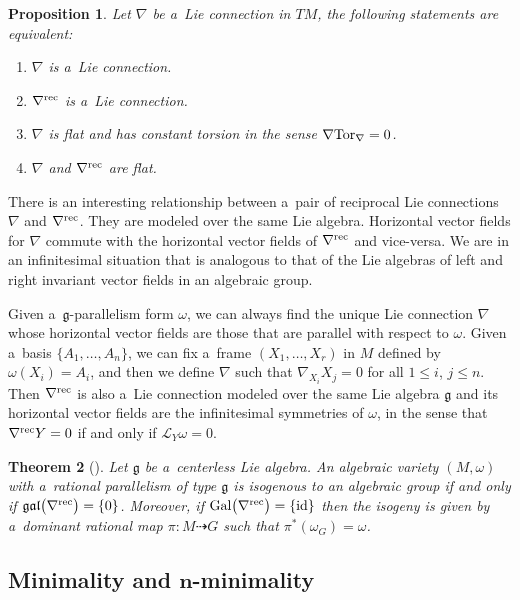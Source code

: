 \documentclass[10pt,a4paper]{amsart}
\numberwithin{equation}{section}
\newtheorem{Theorem}{Theorem}[section]
\newtheorem{Proposition}[Theorem]{Proposition}
\theoremstyle{definition}
\begin{document}
\begin{Proposition}
Let $\nabla$ be a~Lie connection in $TM$, the following statements are equivalent:
\begin{enumerate}\itemsep=0pt
 \item[$(1)$] $\nabla$ is a~Lie connection.
 \item[$(2)$] $\nabla^{\rm rec}$ is a~Lie connection.
 \item[$(3)$] $\nabla$ is flat and has constant torsion in the sense $\nabla {\rm Tor}_\nabla = 0$.
 \item[$(4)$] $\nabla$ and $\nabla^{\rm rec}$ are flat.
\end{enumerate}
\end{Proposition}

There is an interesting relationship between a~pair of reciprocal Lie connections $\nabla$ and $\nabla^{\rm rec}$. They are modeled over the same Lie algebra. Horizontal vector fields for $\nabla$ commute with the horizontal vector fields of $\nabla^{\rm rec}$ and vice-versa. We are in an infinitesimal situation that is analogous to that of the Lie algebras of left and right invariant vector fields in an algebraic group.

Given a~$\mathfrak g$-parallelism form $\omega$, we can always find the unique Lie connection $\nabla$ whose horizontal vector fields are those that are parallel with respect to $\omega$. Given a~basis $\{A_1,\dots,A_n\}$, we can fix a~frame $(X_1,\dots,X_r)$ in $M$ defined by $\omega(X_i)=A_i$, and then we define $\nabla$ such that $\nabla_{X_i}X_j = 0$ for all $1 \leq i$, $j \leq n$.
Then $\nabla^{\rm rec}$ is also a~Lie connection modeled over the same Lie algebra $\mathfrak g$ and its horizontal vector fields are the infinitesimal symmetries of $\omega$, in the sense that $\nabla^{\rm rec} Y = 0$ if and only if $\mathcal{L}_Y\omega = 0$.

\begin{Theorem}[{\cite[Corollary 4.3\,(a) and (d)]{bc2017}}]\label{thm:0}
Let $\mathfrak g$ be a~centerless Lie algebra. An algebraic variety $(M,\omega)$ with a~rational parallelism of type $\mathfrak g$ is isogenous to an algebraic group if and only if $\mathfrak{gal}\bigl(\nabla^{\rm rec}\bigr) = \{0\}$. Moreover, if ${\rm Gal}\bigl(\nabla^{\rm rec}\bigr) = \{ \rm id \}$ then the isogeny is given by a~dominant rational map $\pi\colon M \dasharrow G$ such that $\pi^*(\omega_G) = \omega$.
\end{Theorem}

\subsection[Minimality and n-minimality]{Minimality and $\boldsymbol{n}$-minimality}
\end{document}
